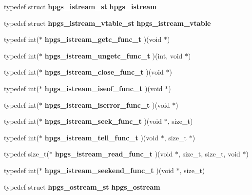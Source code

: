 \begin{CompactItemize}
\item 
typedef struct {\bf hpgs\_\-istream\_\-st} \textbf{hpgs\_\-istream}\label{group__base_gb25ff4e14eb9bdcca226366b3706db25}

\item 
typedef struct {\bf hpgs\_\-istream\_\-vtable\_\-st} \textbf{hpgs\_\-istream\_\-vtable}\label{group__base_gba260b5c9250efc155ac0110287bb979}

\item 
typedef int($\ast$ \textbf{hpgs\_\-istream\_\-getc\_\-func\_\-t} )(void $\ast$)\label{group__base_g37dd7ea28f1d328d1ea5281f425b2f3b}

\item 
typedef int($\ast$ \textbf{hpgs\_\-istream\_\-ungetc\_\-func\_\-t} )(int, void $\ast$)\label{group__base_g6f547af6fefa0a7dcd8cf68f27e2691a}

\item 
typedef int($\ast$ \textbf{hpgs\_\-istream\_\-close\_\-func\_\-t} )(void $\ast$)\label{group__base_g4b32300990917abe2f30daa66677c803}

\item 
typedef int($\ast$ \textbf{hpgs\_\-istream\_\-iseof\_\-func\_\-t} )(void $\ast$)\label{group__base_g4ae8f88a9c6dd4477034e97034a1020c}

\item 
typedef int($\ast$ \textbf{hpgs\_\-istream\_\-iserror\_\-func\_\-t} )(void $\ast$)\label{group__base_g9300e5b3f98786a7c377b56bd04de348}

\item 
typedef int($\ast$ \textbf{hpgs\_\-istream\_\-seek\_\-func\_\-t} )(void $\ast$, size\_\-t)\label{group__base_g9a77b5f808d21c733cbf7a1f869824f9}

\item 
typedef int($\ast$ \textbf{hpgs\_\-istream\_\-tell\_\-func\_\-t} )(void $\ast$, size\_\-t $\ast$)\label{group__base_g6ae96c4a5b1f83c1dbd93e09f5855b60}

\item 
typedef size\_\-t($\ast$ \textbf{hpgs\_\-istream\_\-read\_\-func\_\-t} )(void $\ast$, size\_\-t, size\_\-t, void $\ast$)\label{group__base_gbc43b203b3772c3f03c6b54019146a7b}

\item 
typedef int($\ast$ \textbf{hpgs\_\-istream\_\-seekend\_\-func\_\-t} )(void $\ast$, size\_\-t)\label{group__base_gf288d6ec93cc5e6c446ff1f8c1800a73}

\item 
typedef struct {\bf hpgs\_\-ostream\_\-st} \textbf{hpgs\_\-ostream}\label{group__base_gd6d11d1839853862992558a3e2d8cfc7}


\end{CompactItemize}
